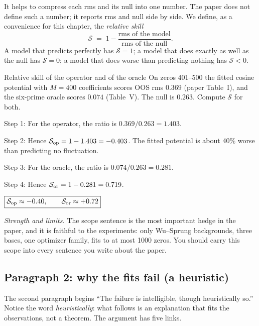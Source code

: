 It helps to compress each rms and its null into one number. The paper does not define such a number; it reports rms and null side by side. We define, as a convenience for this chapter, the \emph{relative skill}
\begin{equation}
\mathcal{S} \;=\; 1-\frac{\text{rms of the model}}{\text{rms of the null}} .
\label{eq:paper-critique-skill}
\end{equation}
A model that predicts perfectly has $\mathcal{S}=1$; a model that does exactly as well as the null has $\mathcal{S}=0$; a model that does worse than predicting nothing has $\mathcal{S}<0$.

\begin{sample}{Relative skill of the operator and of the oracle}
On zeros 401--500 the fitted cosine potential with $M=400$ coefficients scores OOS rms $0.369$ (paper Table~I), and the six-prime oracle scores $0.074$ (Table~V). The null is $0.263$. Compute $\mathcal{S}$ for both.

Step 1: For the operator, the ratio is $0.369/0.263=1.403$.

Step 2: Hence $\mathcal{S}_{\rm op}=1-1.403=-0.403$. The fitted potential is about 40\% worse than predicting no fluctuation.

Step 3: For the oracle, the ratio is $0.074/0.263=0.281$.

Step 4: Hence $\mathcal{S}_{\rm or}=1-0.281=0.719$.

$\boxed{\mathcal{S}_{\rm op}\approx-0.40,\qquad \mathcal{S}_{\rm or}\approx+0.72}$
\end{sample}

\emph{Strength and limits.} The scope sentence is the most important hedge in the paper, and it is faithful to the experiments: only Wu--Sprung backgrounds, three bases, one optimizer family, fits to at most 1000 zeros. You should carry this scope into every sentence you write about the paper.

\subsection{Paragraph 2: why the fits fail (a heuristic)}

The second paragraph begins ``The failure is intelligible, though heuristically so.'' Notice the word \emph{heuristically}: what follows is an explanation that fits the observations, not a theorem. The argument has five links.

